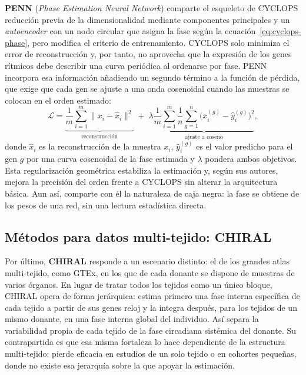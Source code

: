 \documentclass[12pt, a4paper]{report}
\begin{document}
\textbf{PENN} (\textit{Phase Estimation Neural Network}) \cite{penn2023} comparte el esqueleto de CYCLOPS reducción previa de la dimensionalidad mediante componentes principales y un \textit{autoencoder} con un nodo circular que asigna la fase según la ecuación~\eqref{eq:cyclops-phase}, pero modifica el criterio de entrenamiento. CYCLOPS solo minimiza el error de reconstrucción y, por tanto, no aprovecha que la expresión de los genes rítmicos debe describir una curva periódica al ordenarse por fase. PENN incorpora esa información añadiendo un segundo término a la función de pérdida, que exige que cada gen se ajuste a una onda cosenoidal cuando las muestras se colocan en el orden estimado:
\begin{equation}
    \mathcal{L} = \underbrace{\frac{1}{m}\sum_{i=1}^{m}\big\lVert x_i - \hat{x}_i\big\rVert^2}_{\text{reconstrucción}}
    \; + \;
    \lambda \underbrace{\frac{1}{m}\sum_{i=1}^{m}\frac{1}{n}\sum_{g=1}^{n}\Big(x_i^{(g)} - \hat{y}_i^{(g)}\Big)^2}_{\text{ajuste a coseno}},
    \label{eq:penn-loss}
\end{equation}
donde $\hat{x}_i$ es la reconstrucción de la muestra $x_i$, $\hat{y}_i^{(g)}$ es el valor predicho para el gen $g$ por una curva cosenoidal de la fase estimada y $\lambda$ pondera ambos objetivos. Esta regularización geométrica estabiliza la estimación y, según sus autores, mejora la precisión del orden frente a CYCLOPS sin alterar la arquitectura básica. Aun así, comparte con él la naturaleza de caja negra: la fase se obtiene de los pesos de una red, sin una lectura estadística directa.

\subsection{Métodos para datos multi-tejido: CHIRAL}
\label{subsec:chiral}

Por último, \textbf{CHIRAL} \cite{chiral2020} responde a un escenario distinto: el de los grandes atlas multi-tejido, como GTEx, en los que de cada donante se dispone de muestras de varios órganos. En lugar de tratar todos los tejidos como un único bloque, CHIRAL opera de forma jerárquica: estima primero una fase interna específica de cada tejido a partir de sus genes reloj y la integra después, para los tejidos de un mismo donante, en una fase interna global del individuo. Así separa la variabilidad propia de cada tejido de la fase circadiana sistémica del donante. Su contrapartida es que esa misma fortaleza lo hace dependiente de la estructura multi-tejido: pierde eficacia en estudios de un solo tejido o en cohortes pequeñas, donde no existe esa jerarquía sobre la que apoyar la estimación.
\end{document}
